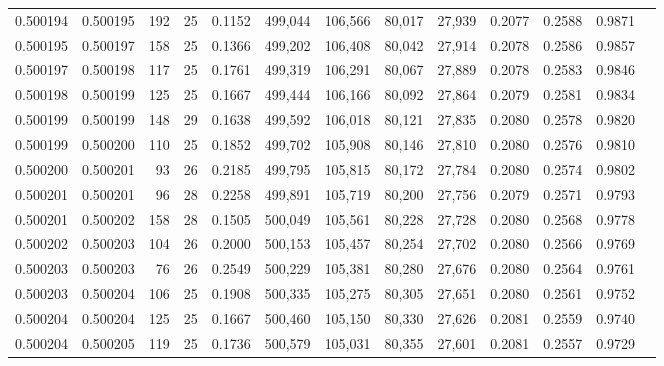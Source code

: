 \begin{tabular}{rrrrrrrrrrrrr}
0.500194 & 0.500195 & 192 &  25 &                                     0.1152 & 499,044 & 106,566 &  80,017 &  27,939 & 0.2077 & 0.2588 & 0.9871 \\
0.500195 & 0.500197 & 158 &  25 &                                     0.1366 & 499,202 & 106,408 &  80,042 &  27,914 & 0.2078 & 0.2586 & 0.9857 \\
0.500197 & 0.500198 & 117 &  25 &                                     0.1761 & 499,319 & 106,291 &  80,067 &  27,889 & 0.2078 & 0.2583 & 0.9846 \\
0.500198 & 0.500199 & 125 &  25 &                                     0.1667 & 499,444 & 106,166 &  80,092 &  27,864 & 0.2079 & 0.2581 & 0.9834 \\
0.500199 & 0.500199 & 148 &  29 &                                     0.1638 & 499,592 & 106,018 &  80,121 &  27,835 & 0.2080 & 0.2578 & 0.9820 \\
0.500199 & 0.500200 & 110 &  25 &                                     0.1852 & 499,702 & 105,908 &  80,146 &  27,810 & 0.2080 & 0.2576 & 0.9810 \\
0.500200 & 0.500201 &  93 &  26 &                                     0.2185 & 499,795 & 105,815 &  80,172 &  27,784 & 0.2080 & 0.2574 & 0.9802 \\
0.500201 & 0.500201 &  96 &  28 &                                     0.2258 & 499,891 & 105,719 &  80,200 &  27,756 & 0.2079 & 0.2571 & 0.9793 \\
0.500201 & 0.500202 & 158 &  28 &                                     0.1505 & 500,049 & 105,561 &  80,228 &  27,728 & 0.2080 & 0.2568 & 0.9778 \\
0.500202 & 0.500203 & 104 &  26 &                                     0.2000 & 500,153 & 105,457 &  80,254 &  27,702 & 0.2080 & 0.2566 & 0.9769 \\
0.500203 & 0.500203 &  76 &  26 &                                     0.2549 & 500,229 & 105,381 &  80,280 &  27,676 & 0.2080 & 0.2564 & 0.9761 \\
0.500203 & 0.500204 & 106 &  25 &                                     0.1908 & 500,335 & 105,275 &  80,305 &  27,651 & 0.2080 & 0.2561 & 0.9752 \\
0.500204 & 0.500204 & 125 &  25 &                                     0.1667 & 500,460 & 105,150 &  80,330 &  27,626 & 0.2081 & 0.2559 & 0.9740 \\
0.500204 & 0.500205 & 119 &  25 &                                     0.1736 & 500,579 & 105,031 &  80,355 &  27,601 & 0.2081 & 0.2557 & 0.9729 \\

\end{tabular}
